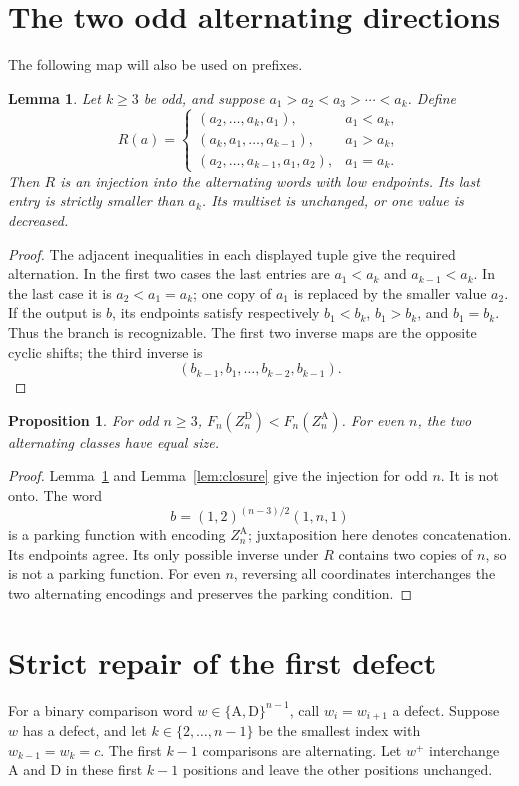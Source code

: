 \documentclass[11pt]{article}
\newtheorem{lemma}[theorem]{Lemma}
\newtheorem{proposition}[theorem]{Proposition}
\theoremstyle{definition}
\newcommand{\A}{\mathrm A}
\newcommand{\D}{\mathrm D}
\begin{document}
\section{The two odd alternating directions}\label{sec:odd}
The following map will also be used on prefixes.

\begin{lemma}\label{lem:R}
Let $k\ge3$ be odd, and suppose
$a_1>a_2<a_3>\cdots<a_k$. Define
\[
R(a)=
\begin{cases}
(a_2,\ldots,a_k,a_1),&a_1<a_k,\\
(a_k,a_1,\ldots,a_{k-1}),&a_1>a_k,\\
(a_2,\ldots,a_{k-1},a_1,a_2),&a_1=a_k.
\end{cases}
\]
Then $R$ is an injection into the alternating words with low
endpoints. Its last entry is strictly smaller than $a_k$.
Its multiset is unchanged, or one value is decreased.
\end{lemma}
\begin{proof}
The adjacent inequalities in each displayed tuple give the required
alternation. In the first two cases the last entries are $a_1<a_k$
and $a_{k-1}<a_k$. In the last case it is $a_2<a_1=a_k$;
one copy of $a_1$ is replaced by the smaller value $a_2$.
If the output is $b$, its endpoints satisfy respectively
$b_1<b_k$, $b_1>b_k$, and $b_1=b_k$.
Thus the branch is recognizable. The first two inverse maps are
the opposite cyclic shifts; the third inverse is
\[
(b_{k-1},b_1,\ldots,b_{k-2},b_{k-1}).
\]
\end{proof}

\begin{proposition}\label{prop:directions}
For odd $n\ge3$, $F_n(Z_n^\D)<F_n(Z_n^\A)$.
For even $n$, the two alternating classes have equal size.
\end{proposition}
\begin{proof}
Lemma~\ref{lem:R} and Lemma~\ref{lem:closure} give the injection
for odd $n$. It is not onto. The word
\[
b=(1,2)^{(n-3)/2}(1,n,1)
\]
is a parking function with encoding $Z_n^\A$; juxtaposition here
denotes concatenation. Its endpoints agree. Its only possible inverse
under $R$ contains two copies of $n$, so is not a parking function.
For even $n$, reversing all coordinates interchanges the two
alternating encodings and preserves the parking condition.
\end{proof}

\section{Strict repair of the first defect}\label{sec:binary}
For a binary comparison word $w\in\{\A,\D\}^{n-1}$, call
$w_i=w_{i+1}$ a defect. Suppose $w$ has a defect, and let
$k\in\{2,\ldots,n-1\}$ be the smallest index with
$w_{k-1}=w_k=c$. The first $k-1$ comparisons are alternating.
Let $w^+$ interchange $\A$ and $\D$ in these first $k-1$
positions and leave the other positions unchanged.
\end{document}
